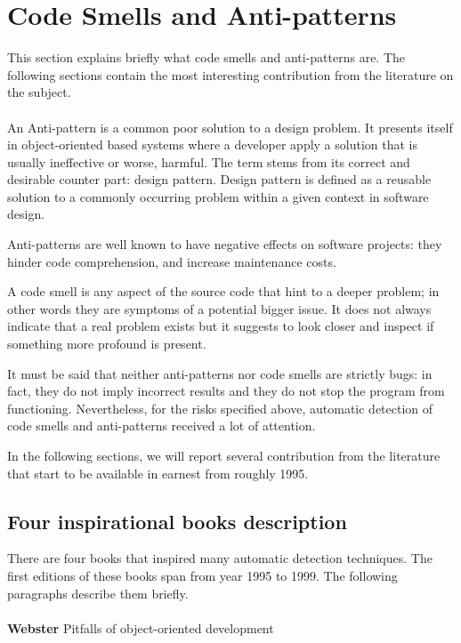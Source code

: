 \section{Code Smells and Anti-patterns}
This section explains briefly what code smells and anti-patterns are. The following sections contain the most interesting contribution from the literature on the subject.
\\
\\
An Anti-pattern is a common poor solution to a design problem. It presents itself in object-oriented based systems where a developer apply a solution that is usually ineffective or worse, harmful.
The term stems from its correct and desirable counter part: design pattern.
Design pattern is defined as a reusable solution to a commonly occurring problem within a given context in software design.

Anti-patterns are well known to have negative effects on software projects: they hinder code comprehension, and increase maintenance costs.

A code smell is any aspect of the source code that hint to a deeper problem; in other words they are symptoms of a potential bigger issue. It does not always indicate that a real problem exists but it suggests to look closer and inspect if something more profound is present.

It must be said that neither anti-patterns nor code smells are strictly bugs: in fact, they do not imply incorrect results and they do not stop the program from functioning. Nevertheless, for the risks specified above, automatic detection of code smells and anti-patterns received a lot of attention. 

In the following sections, we will report several contribution from the literature that start to be available in earnest from roughly 1995.


\subsection{Four inspirational books description}

There are four books that inspired many automatic detection techniques. The first editions of these books span from year 1995 to 1999. 
The following paragraphs describe them briefly.
\\
\\
\textbf{Webster} \cite{webster1995pitfalls} Pitfalls of object-oriented development


